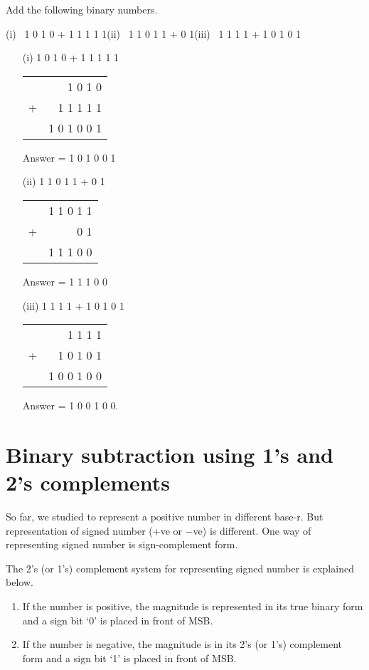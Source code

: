 \begin{problem}\label{prob5.27}
Add the following binary numbers.

\smallskip
(i)~ 1 0 1 0 + 1 1 1 1 1\hfil (ii)~ 1 1 0 1 1 + 0 1\hfil (iii)~ 1 1 1 1 + 1 0 1 0 1
\end{problem}

\begin{solution}
\begin{itemize}
\item[(i)] 1 0 1 0 + 1 1 1 1 1
\begin{center}
\begin{tabular}{r@{\;}r}
 & 1 0 1 0\\
+ & 1 1 1 1 1\\
\cline{2-2}
 & 1 0 1 0 0 1
\end{tabular}
\end{center}
Answer = 1 0 1 0 0 1

\item[(ii)] 1 1 0 1 1 + 0 1
\begin{center}
\begin{tabular}{r@{\;}r}
 & 1 1 0 1 1\\
+ & 0 1\\
\cline{2-2}
 & 1 1 1 0 0 
\end{tabular}
\end{center}
Answer = 1 1 1 0 0

\item[(iii)] 1 1 1 1 + 1 0 1 0 1
\begin{center}
\begin{tabular}{r@{\;}r}
 & 1 1 1 1\\
+ & 1 0 1 0 1\\
\cline{2-2}
 & 1 0 0 1 0 0
\end{tabular}
\end{center}
Answer = 1 0 0 1 0 0.
\end{itemize}
\end{solution}

\section{Binary subtraction using 1's and 2's complements}\label{sec5.6}

So far, we studied to represent a positive number in different base-r. But representation of signed number (+ve or $-$ve) is different. One way of representing signed number is sign-complement form.

The 2's (or 1's) complement system for representing signed number is explained below.
\begin{enumerate}
\item If the number is positive, the magnitude is represented in its true binary form and a sign bit `0' is placed in front of MSB.

\item If the number is negative, the magnitude is in its 2's (or 1's) complement form and a sign bit `1' is placed in front of MSB.
\end{enumerate}

